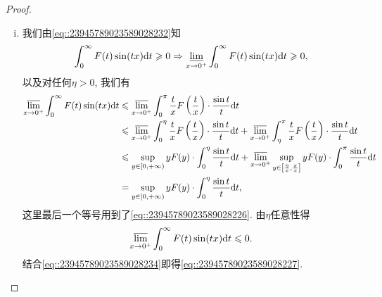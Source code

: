 \documentclass[../../main.tex]{subfiles}%
\begin{document}
\begin{proof}
\begin{enumerate}[(i)]
\item 我们由\eqref{eq::23945789023589028232}知
\begin{align}
\int_0^\infty F(t)\sin(tx)\mathrm{d}t \geqslant 0 \Rightarrow \varliminf_{x \to 0^+} \int_0^\infty F(t)\sin(tx)\mathrm{d}t \geqslant 0, \label{eq::23945789023589028234}
\end{align}
以及对任何$\eta > 0$, 我们有
\begin{align*}
\varlimsup_{x \to 0^+} \int_0^\infty F(t)\sin(tx)\mathrm{d}t &\leqslant \varlimsup_{x \to 0^+} \int_0^\pi \frac{t}{x}F\left(\frac{t}{x}\right) \cdot \frac{\sin t}{t}\mathrm{d}t \\
&\leqslant \varlimsup_{x \to 0^+} \int_0^\eta \frac{t}{x}F\left(\frac{t}{x}\right) \cdot \frac{\sin t}{t}\mathrm{d}t + \varlimsup_{x \to 0^+} \int_\eta^\pi \frac{t}{x}F\left(\frac{t}{x}\right) \cdot \frac{\sin t}{t}\mathrm{d}t \\
&\leqslant \sup_{y \in [0,+\infty)} yF(y) \cdot \int_0^\eta \frac{\sin t}{t}\mathrm{d}t + \varlimsup_{x \to 0^+} \sup_{y \in \left[ \frac{\eta}{x}, \frac{\pi}{x} \right]} yF(y) \cdot \int_0^\pi \frac{\sin t}{t}\mathrm{d}t \\
&= \sup_{y \in [0,+\infty)} yF(y) \cdot \int_0^\eta \frac{\sin t}{t}\mathrm{d}t,
\end{align*}
这里最后一个等号用到了\eqref{eq::23945789023589028226}. 由$\eta$任意性得
\[
\varlimsup_{x \to 0^+} \int_0^\infty F(t)\sin(tx)\mathrm{d}t \leqslant 0.
\]
结合\eqref{eq::23945789023589028234}即得\eqref{eq::23945789023589028227}.
\end{enumerate}
\end{proof}
\end{document}
